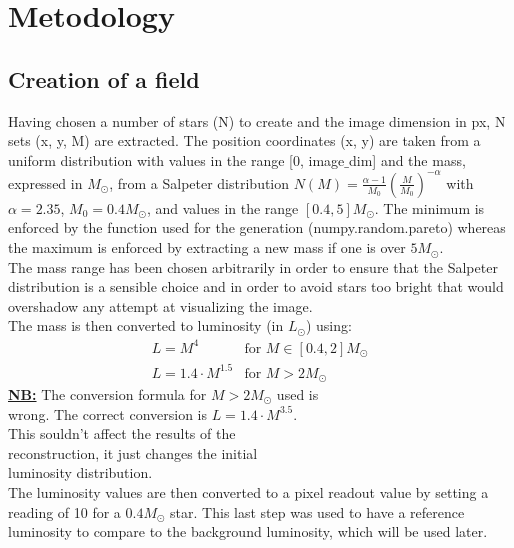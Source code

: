 \documentclass[a4paper]{article}
\begin{document}
	\section{Metodology}
	\begin{multicols}{2}
		\subsection{Creation of a field}
			Having chosen a number of stars (N) to create and the image dimension in px, N sets (x, y, M) are extracted. The position coordinates (x, y) are taken from a uniform distribution with values in the range [0, image$\_$dim] and the mass, expressed in $M_{\odot}$, from a Salpeter distribution $N(M) = \frac{\alpha - 1}{M_0}(\frac{M}{M_0})^{-\alpha}$ with $\alpha = 2.35$, $M_0 = 0.4 M_{\odot}$, and values in the range $[0.4, 5] M_{\odot}$. The minimum is enforced by the function used for the generation (numpy.random.pareto) whereas the maximum is enforced by extracting a new mass if one is over $5M_{\odot}$.\\
			The mass range has been chosen arbitrarily in order to ensure that the Salpeter distribution is a sensible choice and in order to avoid stars too bright that would overshadow any attempt at visualizing the image.\\
			The mass is then converted to luminosity (in $L_{\odot}$) using:
			\[
				\begin{array}{lc}
					L = M^4 & \text{for } M\in[0.4,2]M_{\odot}\\
					L = 1.4 \cdot M^{1.5} & \text{for } M>2M_{\odot}
				\end{array}
			\]
			\newline
			\underline{\textbf{NB:}} The conversion formula for $M>2M_{\odot}$ used is\\ 
			\indent\indent wrong. The correct conversion is $L = 1.4 \cdot M^{3.5}$.\\
			\indent\indent This souldn't affect the results of the\\
			\indent\indent reconstruction, it just changes the initial\\
			\indent\indent luminosity distribution.\\
			
			The luminosity values are then converted to a pixel readout value by setting a reading of 10 for a $0.4M_{\odot}$ star. This last step was used to have a reference luminosity to compare to the background luminosity, which will be used later.\\
			

\end{multicols}
\end{document}
